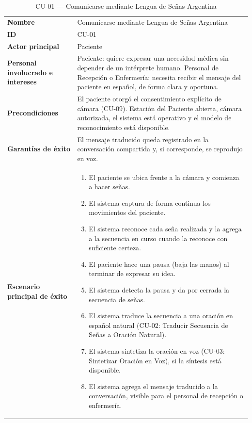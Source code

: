 \begin{longtable}{@{}>{\raggedright\arraybackslash}p{4.1cm} >{\raggedright\arraybackslash}p{\dimexpr\textwidth-4.1cm-2\tabcolsep\relax}@{}}
\caption{CU-01 --- Comunicarse mediante Lengua de Señas Argentina}\\
\toprule
\textbf{Nombre} & Comunicarse mediante Lengua de Señas Argentina \\
\textbf{ID} & CU-01 \\
\textbf{Actor principal} & Paciente \\
\textbf{Personal involucrado e intereses} &
Paciente: quiere expresar una necesidad médica sin depender de un
intérprete humano. \newline
Personal de Recepción o Enfermería: necesita recibir el mensaje del
paciente en español, de forma clara y oportuna. \\
\textbf{Precondiciones} &
El paciente otorgó el consentimiento explícito de cámara (CU-09).
Estación del Paciente abierta, cámara autorizada, el sistema está
operativo y el modelo de reconocimiento está disponible. \\
\textbf{Garantías de éxito} &
El mensaje traducido queda registrado en la conversación compartida y, si
corresponde, se reprodujo en voz. \\
\textbf{Escenario principal de éxito} &
\begin{enumerate}[leftmargin=*, itemsep=2pt]
    \item El paciente se ubica frente a la cámara y comienza a hacer señas.
    \item El sistema captura de forma continua los movimientos del paciente.
    \item El sistema reconoce cada seña realizada y la agrega a la
    secuencia en curso cuando la reconoce con suficiente certeza.
    \item El paciente hace una pausa (baja las manos) al terminar de
    expresar su idea.
    \item El sistema detecta la pausa y da por cerrada la secuencia de
    señas.
    \item El sistema traduce la secuencia a una oración en español natural
    (CU-02: Traducir Secuencia de Señas a Oración Natural).
    \item El sistema sintetiza la oración en voz (CU-03: Sintetizar
    Oración en Voz), si la síntesis está disponible.
    \item El sistema agrega el mensaje traducido a la conversación,
    visible para el personal de recepción o enfermería.

\end{enumerate}
\end{longtable}
